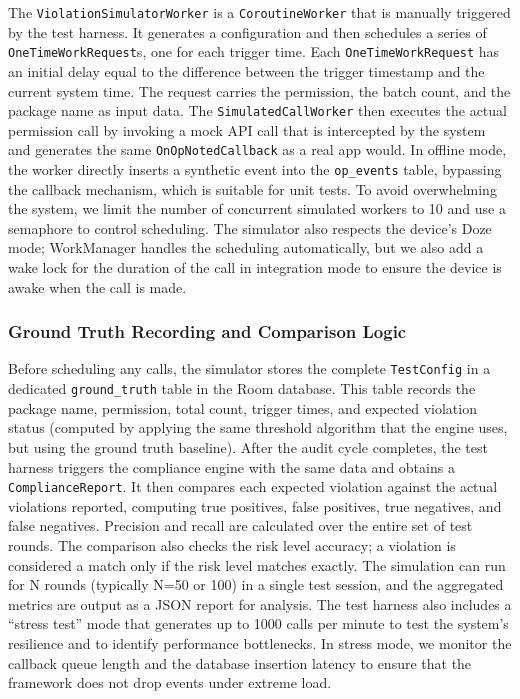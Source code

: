 The \texttt{ViolationSimulatorWorker} is a \texttt{CoroutineWorker} that is manually triggered by the test harness. It generates a configuration and then schedules a series of \texttt{OneTimeWorkRequest}s, one for each trigger time. Each \texttt{OneTimeWorkRequest} has an initial delay equal to the difference between the trigger timestamp and the current system time. The request carries the permission, the batch count, and the package name as input data. The \texttt{SimulatedCallWorker} then executes the actual permission call by invoking a mock API call that is intercepted by the system and generates the same \texttt{OnOpNotedCallback} as a real app would. In offline mode, the worker directly inserts a synthetic event into the \texttt{op\_events} table, bypassing the callback mechanism, which is suitable for unit tests. To avoid overwhelming the system, we limit the number of concurrent simulated workers to 10 and use a semaphore to control scheduling. The simulator also respects the device's Doze mode; WorkManager handles the scheduling automatically, but we also add a wake lock for the duration of the call in integration mode to ensure the device is awake when the call is made.

\subsubsection{Ground Truth Recording and Comparison Logic}

Before scheduling any calls, the simulator stores the complete \texttt{TestConfig} in a dedicated \texttt{ground\_truth} table in the Room database. This table records the package name, permission, total count, trigger times, and expected violation status (computed by applying the same threshold algorithm that the engine uses, but using the ground truth baseline). After the audit cycle completes, the test harness triggers the compliance engine with the same data and obtains a \texttt{ComplianceReport}. It then compares each expected violation against the actual violations reported, computing true positives, false positives, true negatives, and false negatives. Precision and recall are calculated over the entire set of test rounds. The comparison also checks the risk level accuracy; a violation is considered a match only if the risk level matches exactly. The simulation can run for N rounds (typically N=50 or 100) in a single test session, and the aggregated metrics are output as a JSON report for analysis. The test harness also includes a ``stress test'' mode that generates up to 1000 calls per minute to test the system's resilience and to identify performance bottlenecks. In stress mode, we monitor the callback queue length and the database insertion latency to ensure that the framework does not drop events under extreme load.


